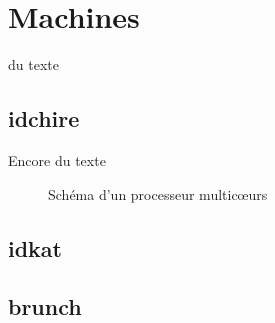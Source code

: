 \section{Machines}\label{sec:contribs:machines}

du texte

\subsection{idchire}\label{sec:contribs:machines:idchire}
Encore du texte

\begin{figure}[ht]
  \centering
  \caption{Schéma d'un processeur multicœurs}\label{fig:contribs:machines:idchire:heatmap}
\end{figure}

\subsection{idkat}
\subsection{brunch}\label{sec:contribs:machines:brunch}

